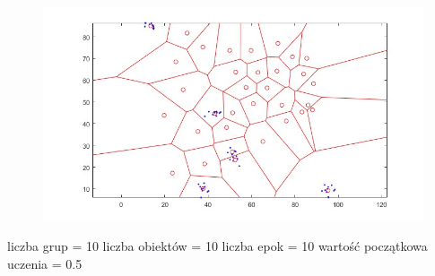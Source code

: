 \documentclass[11pt]{article}
\begin{document}
\begin{figure}[h]
  \includegraphics{screeny/WTA/WTA_5_object/WTA_Areas.jpg}
\end{figure}

liczba grup = 10 liczba obiektów = 10 liczba epok = 10 wartość
początkowa uczenia = 0.5
\end{document}
